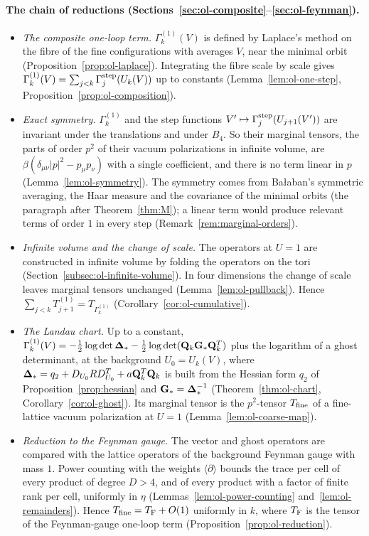 \paragraph{The chain of reductions (Sections~\ref{sec:ol-composite}--\ref{sec:ol-feynman}).}
\begin{itemize}
\item \emph{The composite one-loop term.} $\Gamma^{(1)}_k(V)$ is defined by Laplace's method on the fibre of the fine configurations with averages $V$, near the minimal orbit (Proposition~\ref{prop:ol-laplace}). Integrating the fibre scale by scale gives $\Gamma^{(1)}_k(V)=\sum_{j<k}\Gamma^{\rm step}_j(U_k(V))$ up to constants (Lemma~\ref{lem:ol-one-step}, Proposition~\ref{prop:ol-composition}).
\item \emph{Exact symmetry.} $\Gamma^{(1)}_k$ and the step functions $V'\mapsto\Gamma^{\rm step}_j(U_{j+1}(V'))$ are invariant under the translations and under $B_4$. So their marginal tensors, the parts of order $p^2$ of their vacuum polarizations in infinite volume, are $\beta(\delta_{\mu\nu}|p|^2-p_\mu p_\nu)$ with a single coefficient, and there is no term linear in $p$ (Lemma~\ref{lem:ol-symmetry}). The symmetry comes from Ba\l aban's symmetric averaging, the Haar measure and the covariance of the minimal orbits (the paragraph after Theorem~\ref{thm:M}); a linear term would produce relevant terms of order $1$ in every step (Remark~\ref{rem:marginal-orders}).
\item \emph{Infinite volume and the change of scale.} The operators at $U=1$ are constructed in infinite volume by folding the operators on the tori (Section~\ref{subsec:ol-infinite-volume}). In four dimensions the change of scale leaves marginal tensors unchanged (Lemma~\ref{lem:ol-pullback}). Hence $\sum_{j<k}T^{(1)}_{j+1}=T_{\Gamma^{(1)}_k}$ (Corollary~\ref{cor:ol-cumulative}).
\item \emph{The Landau chart.} Up to a constant, $\Gamma^{(1)}_k(V)=-\frac12\log\det\boldsymbol{\Delta}_*-\frac12\log\det(\mathbf Q_k\mathbf G_*\mathbf Q_k^T)$ plus the logarithm of a ghost determinant, at the background $U_0=U_k(V)$, where $\boldsymbol{\Delta}_*=q_2+D_{U_0}RD^T_{U_0}+a\mathbf Q_k^T\mathbf Q_k$ is built from the Hessian form $q_2$ of Proposition~\ref{prop:hessian} and $\mathbf G_*=\boldsymbol{\Delta}_*^{-1}$ (Theorem~\ref{thm:ol-chart}, Corollary~\ref{cor:ol-ghost}). Its marginal tensor is the $p^2$-tensor $T_{\rm fine}$ of a fine-lattice vacuum polarization at $U=1$ (Lemma~\ref{lem:ol-coarse-map}).
\item \emph{Reduction to the Feynman gauge.} The vector and ghost operators are compared with the lattice operators of the background Feynman gauge with mass $1$. Power counting with the weights $\langle\partial\rangle$ bounds the trace per cell of every product of degree $D>4$, and of every product with a factor of finite rank per cell, uniformly in $\eta$ (Lemmas~\ref{lem:ol-power-counting} and~\ref{lem:ol-remainders}). Hence $T_{\rm fine}=T_{\rm F}+O(1)$ uniformly in $k$, where $T_{\rm F}$ is the tensor of the Feynman-gauge one-loop term (Proposition~\ref{prop:ol-reduction}).

\end{itemize}
